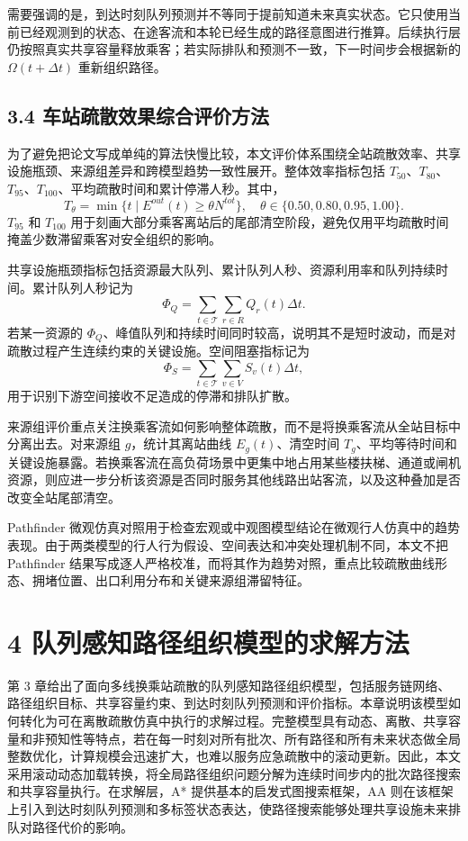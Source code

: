 \documentclass[UTF8,a4paper,12pt]{ctexart}
\begin{document}
需要强调的是，到达时刻队列预测并不等同于提前知道未来真实状态。它只使用当前已经观测到的状态、在途客流和本轮已经生成的路径意图进行推算。后续执行层仍按照真实共享容量释放乘客；若实际排队和预测不一致，下一时间步会根据新的 \(\Omega(t+\Delta t)\) 重新组织路径。

\subsection{3.4 车站疏散效果综合评价方法}

为了避免把论文写成单纯的算法快慢比较，本文评价体系围绕全站疏散效率、共享设施瓶颈、来源组差异和跨模型趋势一致性展开。整体效率指标包括 \(T_{50}\)、\(T_{80}\)、\(T_{95}\)、\(T_{100}\)、平均疏散时间和累计停滞人秒。其中，
\[
T_{\theta}=\min\{t\mid E^{out}(t)\geq \theta N^{tot}\},\quad \theta\in\{0.50,0.80,0.95,1.00\}.
\]
\(T_{95}\) 和 \(T_{100}\) 用于刻画大部分乘客离站后的尾部清空阶段，避免仅用平均疏散时间掩盖少数滞留乘客对安全组织的影响。

共享设施瓶颈指标包括资源最大队列、累计队列人秒、资源利用率和队列持续时间。累计队列人秒记为
\[
\Phi_Q=\sum_{t\in\mathcal T}\sum_{r\in R}Q_r(t)\Delta t.
\]
若某一资源的 \(\Phi_Q\)、峰值队列和持续时间同时较高，说明其不是短时波动，而是对疏散过程产生连续约束的关键设施。空间阻塞指标记为
\[
\Phi_S=\sum_{t\in\mathcal T}\sum_{v\in V}S_v(t)\Delta t,
\]
用于识别下游空间接收不足造成的停滞和排队扩散。

来源组评价重点关注换乘客流如何影响整体疏散，而不是将换乘客流从全站目标中分离出去。对来源组 \(g\)，统计其离站曲线 \(E_g(t)\)、清空时间 \(T_g\)、平均等待时间和关键设施暴露。若换乘客流在高负荷场景中更集中地占用某些楼扶梯、通道或闸机资源，则应进一步分析该资源是否同时服务其他线路出站客流，以及这种叠加是否改变全站尾部清空。

Pathfinder 微观仿真对照用于检查宏观或中观图模型结论在微观行人仿真中的趋势表现。由于两类模型的行人行为假设、空间表达和冲突处理机制不同，本文不把 Pathfinder 结果写成逐人严格校准，而将其作为趋势对照，重点比较疏散曲线形态、拥堵位置、出口利用分布和关键来源组滞留特征。

\section{4 队列感知路径组织模型的求解方法}

第 3 章给出了面向多线换乘站疏散的队列感知路径组织模型，包括服务链网络、路径组织目标、共享容量约束、到达时刻队列预测和评价指标。本章说明该模型如何转化为可在离散疏散仿真中执行的求解过程。完整模型具有动态、离散、共享容量和非预知性等特点，若在每一时刻对所有批次、所有路径和所有未来状态做全局整数优化，计算规模会迅速扩大，也难以服务应急疏散中的滚动更新。因此，本文采用滚动动态加载转换，将全局路径组织问题分解为连续时间步内的批次路径搜索和共享容量执行。在求解层，A* 提供基本的启发式图搜索框架，AA 则在该框架上引入到达时刻队列预测和多标签状态表达，使路径搜索能够处理共享设施未来排队对路径代价的影响。
\end{document}
